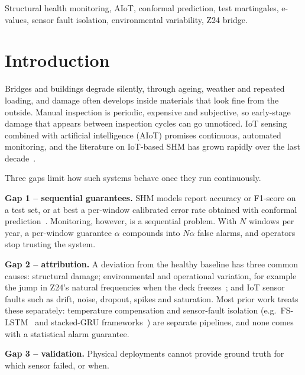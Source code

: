 \documentclass[conference]{IEEEtran}
\begin{document}
\begin{IEEEkeywords}
Structural health monitoring, AIoT, conformal prediction, test martingales, e-values, sensor fault isolation, environmental variability, Z24 bridge.
\end{IEEEkeywords}

\section{Introduction}
Bridges and buildings degrade silently, through ageing, weather and repeated loading, and damage often develops inside materials that look fine from the outside. Manual inspection is periodic, expensive and subjective, so early-stage damage that appears between inspection cycles can go unnoticed. IoT sensing combined with artificial intelligence (AIoT) promises continuous, automated monitoring, and the literature on IoT-based SHM has grown rapidly over the last decade~\cite{deng2023,rahita2024,li2025}.

Three gaps limit how such systems behave once they run continuously.

\textbf{Gap 1 -- sequential guarantees.} SHM models report accuracy or F1-score on a test set, or at best a per-window calibrated error rate obtained with conformal prediction~\cite{angelopoulos2023}. Monitoring, however, is a sequential problem. With $N$ windows per year, a per-window guarantee $\alpha$ compounds into $N\alpha$ false alarms, and operators stop trusting the system.

\textbf{Gap 2 -- attribution.} A deviation from the healthy baseline has three common causes: structural damage; environmental and operational variation, for example the jump in Z24's natural frequencies when the deck freezes~\cite{peeters2001}; and IoT sensor faults such as drift, noise, dropout, spikes and saturation. Most prior work treats these separately: temperature compensation and sensor-fault isolation (e.g.\ FS-LSTM~\cite{li2021fslstm} and stacked-GRU frameworks~\cite{liu2022sgru}) are separate pipelines, and none comes with a statistical alarm guarantee.

\textbf{Gap 3 -- validation.} Physical deployments cannot provide ground truth for which sensor failed, or when.
\end{document}
